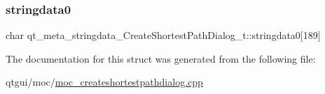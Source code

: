 \subsubsection{\texorpdfstring{stringdata0}{stringdata0}}
{\footnotesize\ttfamily char qt\+\_\+meta\+\_\+stringdata\+\_\+\+Create\+Shortest\+Path\+Dialog\+\_\+t\+::stringdata0\mbox{[}189\mbox{]}}



The documentation for this struct was generated from the following file\+:\begin{DoxyCompactItemize}
\item 
qtgui/moc/\mbox{\hyperlink{moc__createshortestpathdialog_8cpp}{moc\+\_\+createshortestpathdialog.\+cpp}}\end{DoxyCompactItemize}
